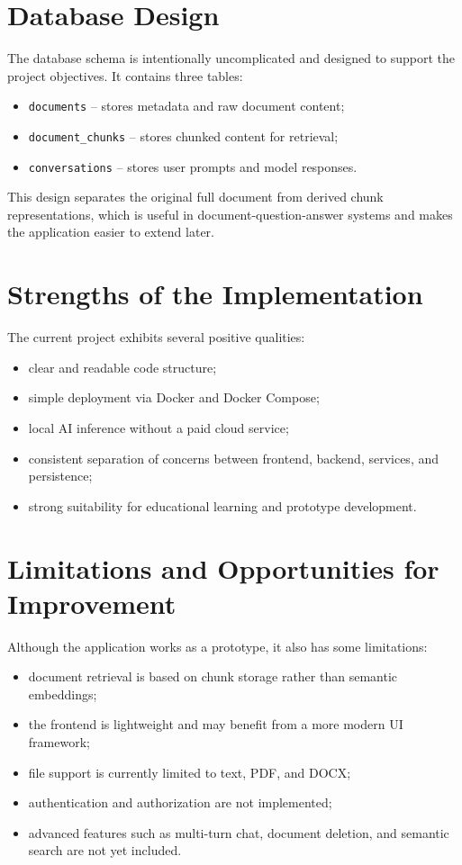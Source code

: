 ﻿\documentclass[11pt,a4paper]{article}
\begin{document}
\section{Database Design}
The database schema is intentionally uncomplicated and designed to support the project objectives. It contains three tables:
\begin{itemize}[leftmargin=*]
    \item \texttt{documents} -- stores metadata and raw document content;
    \item \texttt{document\_chunks} -- stores chunked content for retrieval;
    \item \texttt{conversations} -- stores user prompts and model responses.
\end{itemize}

This design separates the original full document from derived chunk representations, which is useful in document-question-answer systems and makes the application easier to extend later.

\section{Strengths of the Implementation}
The current project exhibits several positive qualities:
\begin{itemize}[leftmargin=*]
    \item clear and readable code structure;
    \item simple deployment via Docker and Docker Compose;
    \item local AI inference without a paid cloud service;
    \item consistent separation of concerns between frontend, backend, services, and persistence;
    \item strong suitability for educational learning and prototype development.
\end{itemize}

\section{Limitations and Opportunities for Improvement}
Although the application works as a prototype, it also has some limitations:
\begin{itemize}[leftmargin=*]
    \item document retrieval is based on chunk storage rather than semantic embeddings;
    \item the frontend is lightweight and may benefit from a more modern UI framework;
    \item file support is currently limited to text, PDF, and DOCX;
    \item authentication and authorization are not implemented;
    \item advanced features such as multi-turn chat, document deletion, and semantic search are not yet included.
\end{itemize}
\end{document}
